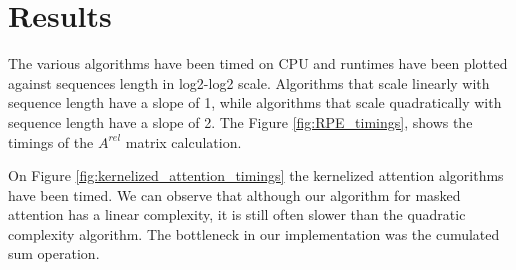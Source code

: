 \section{Results}

The various algorithms have been timed on CPU and runtimes have been plotted against sequences length in log2-log2 scale. Algorithms that scale linearly with sequence length have a slope of 1, while algorithms that scale quadratically with sequence length have a slope of 2. The Figure \ref{fig:RPE_timings}, shows the timings of the $A^{rel}$ matrix calculation.

On Figure \ref{fig:kernelized_attention_timings} the kernelized attention algorithms have been timed. We can observe that although our algorithm for masked attention has a linear complexity, it is still often slower than the quadratic complexity algorithm. The bottleneck in our implementation was the cumulated sum operation.

\endinput
